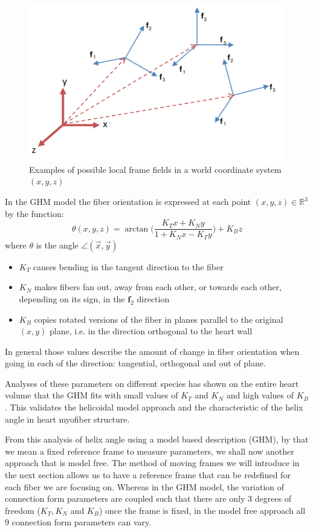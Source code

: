 \begin{figure}
    \centering
    \includegraphics[width=.5\textwidth]{figures/frame_fields}
    \caption{Examples of possible local frame fields in a world coordinate system $(x, y, z)$}
    \label{fig:frame_fields}
\end{figure}

In the GHM model the fiber orientation is expressed at each point $(x, y, z) \in \mathbb{R}^3$ by the function:
\begin{equation}
\theta (x, y, z) = \arctan \Bigg( \frac{K_Tx + K_Ny}{1 + K_Nx - K_Ty} \Bigg) + K_Bz
\end{equation}
where $\theta$ is the angle $\angle (\overrightarrow{x}, \overrightarrow{y})$
\begin{itemize}
    \item $K_T$ causes bending in the tangent direction to the fiber
    \item $K_N$ makes fibers fan out, away from each other, or towards each other, depending on its sign, in the $\mathbf{f}_2$ direction
    \item $K_B$ copies rotated versions of the fiber in planes parallel to the original $(x, y)$ plane, i.e. in the direction orthogonal to the heart wall
\end{itemize}
In general those values describe the amount of change in fiber orientation when going in each of the direction: tangential, orthogonal and out of plane.

Analyses of these parameters on different species has shown on the entire heart volume \cite{savadjiev2012heart} that the GHM fits with small values of $K_T$ and $K_N$ and high values of $K_B$. This validates the helicoidal model approach and the characteristic of the helix angle in heart myofiber structure.

From this analysis of helix angle using a model based description (GHM), by that we mean a fixed reference frame to measure parameters, we shall now another approach that is model free. The method of moving frames we will introduce in the next section allows us to have a reference frame that can be redefined for each fiber we are focusing on. Whereas in the GHM model, the variation of connection form parameters are coupled such that there are only 3 degrees of freedom ($K_T, K_N$ and $K_B$) once the frame is fixed, in the model free approach all 9 connection form parameters can vary.

